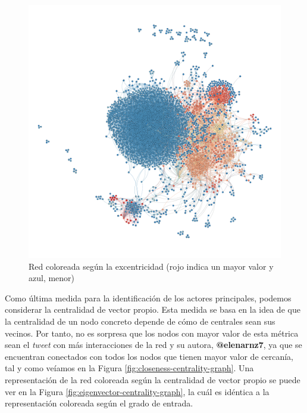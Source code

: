 \begin{figure}
    \centering
    \includegraphics[width=\textwidth]{images/graph/eccentricity.png}
    \caption{Red coloreada según la excentricidad (rojo indica un mayor valor y azul, menor)}
    \label{fig:eccentricity-graph}
\end{figure}

Como última medida para la identificación de los actores principales, podemos
considerar la centralidad de vector propio. Esta medida se basa en la idea de
que la centralidad de un nodo concreto depende de cómo de centrales sean sus
vecinos. Por tanto, no es sorpresa que los nodos con mayor valor de esta métrica
sean el \textit{tweet} con más interacciones de la red y su autora,
\textbf{@elenarnz7}, ya que se encuentran conectados con todos los nodos que
tienen mayor valor de cercanía, tal y como veíamos en la Figura
\ref{fig:closeness-centrality-graph}. Una representación de la red coloreada
según la centralidad de vector propio se puede ver en la Figura
\ref{fig:eigenvector-centrality-graph}, la cuál es idéntica a la representación
coloreada según el grado de entrada.

